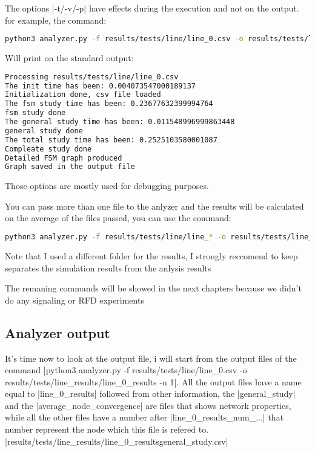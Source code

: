 \documentclass[10pt,journal,onecolumn]{IEEEtran}
\begin{document}
The options |-t/-v/-p| have effects during the execution and not on the output.
for example, the command:
\begin{lstlisting}[language=bash]
python3 analyzer.py -f results/tests/line/line_0.csv -o results/tests/line/line_0_results -n 1 -t -v -p
\end{lstlisting}
Will print on the standard output:
\begin{lstlisting}[language=bash]
Processing results/tests/line/line_0.csv
The init time has been: 0.004073547000189137
Initialization done, csv file loaded
The fsm study time has been: 0.23677632399994764
fsm study done
The general study time has been: 0.011548996999863448
general study done
The total study time has been: 0.2525103580001087
Compleate study done
Detailed FSM graph produced
Graph saved in the output file
\end{lstlisting}
Those options are mostly used for debugging purposes.

You can pass more than one file to the anlyzer and the results will be calculated
on the average of the files passed, you can use the command:
\begin{lstlisting}[language=bash]
python3 analyzer.py -f results/tests/line/line_* -o results/tests/line_results/line_results -n 1
\end{lstlisting}
Note that I used a different folder for the results, I strongly reccomend to keep
separates the simulation results from the anlysis results

The remaning commands will be showed in the next chapters because we didn't do
any signaling or \ac{RFD} experiments

\subsection{Analyzer output}
\label{subsec:anal_output}

It's time now to look at the output file, i will start from the output files 
of the command |python3 analyzer.py -f results/tests/line/line_0.csv -o results/tests/line_results/line_0_results -n 1|.
All the output files have a name equal to |line_0_results| followed from 
other information, the |general_study| and the |average_node_convergence| are 
files that shows network properties, while all the other files
have a number after |line_0_results_{num}_...| that number represent the node 
which this file is refered to.\\

|results/tests/line_results/line_0_resultsgeneral_study.csv|\\
\end{document}
